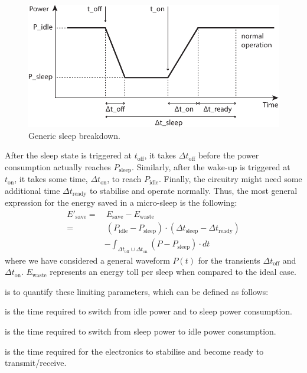 \documentclass[twoside,nohyper]{tufte-book}
\providecommand{\tightlist}{%
  \setlength{\itemsep}{0pt}\setlength{\parskip}{0pt}}
\begin{document}
\begin{figure}

{\centering \includegraphics{img/05/timing} 

}

\caption[Generic sleep breakdown.]{Generic sleep breakdown.}\label{fig:timing}
\end{figure}

After the sleep state is triggered at \(t_\mathrm{off}\), it takes \(\Delta t_\mathrm{off}\) before the power consumption actually reaches \(P_\mathrm{sleep}\). Similarly, after the wake-up is triggered at \(t_\mathrm{on}\), it takes some time, \(\Delta t_\mathrm{on}\), to reach \(P_\mathrm{idle}\). Finally, the circuitry might need some additional time \(\Delta t_\mathrm{ready}\) to stabilise and operate normally. Thus, the most general expression for the energy saved in a micro-sleep is the following:
%
\begin{equation}
\begin{split}
 E'_\mathrm{save} =&~ E_\mathrm{save} - E_\mathrm{waste} \\
 =&~ (P_\mathrm{idle} - P_\mathrm{sleep}) \cdot (\Delta t_\mathrm{sleep} -\Delta t_\mathrm{ready}) \\
 &- \int_{\Delta t_\mathrm{off} \cup \Delta t_\mathrm{on}} (P - P_\mathrm{sleep}) \cdot dt
\end{split}
\label{eq:realsleep}
\end{equation}
%
where we have considered a general waveform \(P(t)\) for the transients \(\Delta t_\mathrm{off}\) and \(\Delta t_\mathrm{on}\). \(E_\mathrm{waste}\) represents an energy toll per sleep when compared to the ideal case.

 is to quantify these limiting parameters, which can be defined as follows:

\begin{description}
\tightlist
\item[\(\Delta t_\mathrm{off}\)]
is the time required to switch from idle power and to sleep power consumption.
\item[\(\Delta t_\mathrm{on}\)]
is the time required to switch from sleep power to idle power consumption.
\item[\(\Delta t_\mathrm{ready}\)]
is the time required for the electronics to stabilise and become ready to transmit/receive.
\end{description}
\end{document}
